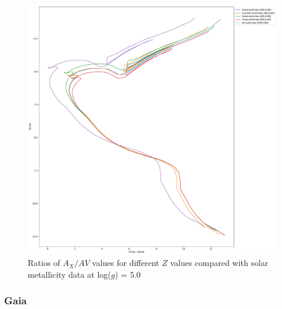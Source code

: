 \documentclass[a4paper, 11pt, oneside]{LJMU_Astro_Thesis}  %
\begin{document}
\begin{figure}[h]
\begin{center}
\includegraphics[scale=0.3]{../basti_isochrones_10_13Gyr/Extinction_T50k_FeH0fix_func_f814w_f275wmf814w_500_400_600_Myr_FeH_0p002_ref_noext_Av_1p0.pdf}
\caption{Ratios of $A_{X}/A{V}$ values for different $Z$ values compared with solar metallicity data at log($g$) = 5.0}
\label{wfc3_isoc2_T50k}
\end{center}
\end{figure}

\subsubsection{Gaia} \label{Gaia_isoc}
\end{document}
